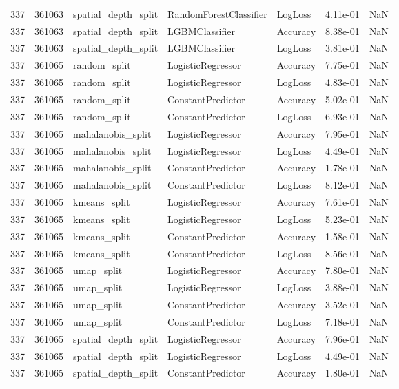 \begin{tabular}{rrlllrr}
337 & 361063 & spatial\_depth\_split & RandomForestClassifier & LogLoss & 4.11e-01 & NaN \\
337 & 361063 & spatial\_depth\_split & LGBMClassifier & Accuracy & 8.38e-01 & NaN \\
337 & 361063 & spatial\_depth\_split & LGBMClassifier & LogLoss & 3.81e-01 & NaN \\
337 & 361065 & random\_split & LogisticRegressor & Accuracy & 7.75e-01 & NaN \\
337 & 361065 & random\_split & LogisticRegressor & LogLoss & 4.83e-01 & NaN \\
337 & 361065 & random\_split & ConstantPredictor & Accuracy & 5.02e-01 & NaN \\
337 & 361065 & random\_split & ConstantPredictor & LogLoss & 6.93e-01 & NaN \\
337 & 361065 & mahalanobis\_split & LogisticRegressor & Accuracy & 7.95e-01 & NaN \\
337 & 361065 & mahalanobis\_split & LogisticRegressor & LogLoss & 4.49e-01 & NaN \\
337 & 361065 & mahalanobis\_split & ConstantPredictor & Accuracy & 1.78e-01 & NaN \\
337 & 361065 & mahalanobis\_split & ConstantPredictor & LogLoss & 8.12e-01 & NaN \\
337 & 361065 & kmeans\_split & LogisticRegressor & Accuracy & 7.61e-01 & NaN \\
337 & 361065 & kmeans\_split & LogisticRegressor & LogLoss & 5.23e-01 & NaN \\
337 & 361065 & kmeans\_split & ConstantPredictor & Accuracy & 1.58e-01 & NaN \\
337 & 361065 & kmeans\_split & ConstantPredictor & LogLoss & 8.56e-01 & NaN \\
337 & 361065 & umap\_split & LogisticRegressor & Accuracy & 7.80e-01 & NaN \\
337 & 361065 & umap\_split & LogisticRegressor & LogLoss & 3.88e-01 & NaN \\
337 & 361065 & umap\_split & ConstantPredictor & Accuracy & 3.52e-01 & NaN \\
337 & 361065 & umap\_split & ConstantPredictor & LogLoss & 7.18e-01 & NaN \\
337 & 361065 & spatial\_depth\_split & LogisticRegressor & Accuracy & 7.96e-01 & NaN \\
337 & 361065 & spatial\_depth\_split & LogisticRegressor & LogLoss & 4.49e-01 & NaN \\
337 & 361065 & spatial\_depth\_split & ConstantPredictor & Accuracy & 1.80e-01 & NaN \\

\end{tabular}
